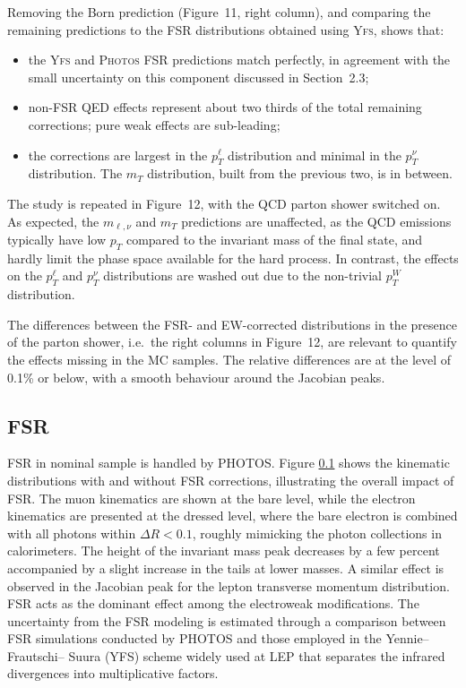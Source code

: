 Removing the Born prediction (Figure~11, right column), and comparing the
remaining predictions to the FSR distributions obtained using \textsc{Yfs}, shows
that:
\begin{itemize}
  \item the \textsc{Yfs} and \textsc{Photos} FSR predictions match perfectly, in agreement
  with the small uncertainty on this component discussed in Section~2.3;
  \item non-FSR QED effects represent about two thirds of the total remaining
  corrections; pure weak effects are sub-leading;
  \item the corrections are largest in the $p_T^\ell$ distribution and
  minimal in the $p_T^\nu$ distribution. The $m_T$ distribution, built from
  the previous two, is in between.
\end{itemize}

The study is repeated in Figure~12, with the QCD parton shower switched on. As
expected, the $m_{\ell,\nu}$ and $m_T$ predictions are unaffected, as the QCD
emissions typically have low $p_T$ compared to the invariant mass of the
final state, and hardly limit the phase space available for the hard process.
In contrast, the effects on the $p_T^\ell$ and $p_T^\nu$ distributions are
washed out due to the non-trivial $p_T^W$ distribution.

The differences between the FSR- and EW-corrected distributions in the
presence of the parton shower, i.e.\ the right columns in Figure~12, are
relevant to quantify the effects missing in the MC samples. The relative
differences are at the level of 0.1\% or below, with a smooth behaviour around
the Jacobian peaks.

\subsection{FSR}
FSR in nominal sample is handled by PHOTOS.
Figure \ref{} shows the kinematic distributions with and without FSR corrections, illustrating the overall impact of FSR. The muon kinematics are shown at the bare level, while the electron kinematics are presented at the dressed level, where the bare electron is combined with all photons within $\Delta R < 0.1$, roughly mimicking the photon collections in calorimeters. The height of the invariant mass peak decreases by a few percent accompanied by a slight increase in the tails at lower masses. A similar effect is observed in the Jacobian peak for the lepton transverse momentum distribution. FSR acts as the dominant effect among the electroweak modifications.
The uncertainty from the FSR modeling is estimated through a comparison between FSR simulations conducted by PHOTOS and those employed in the Yennie–Frautschi– Suura (YFS) scheme \cite{} widely used at LEP that separates the infrared divergences into multiplicative factors.


